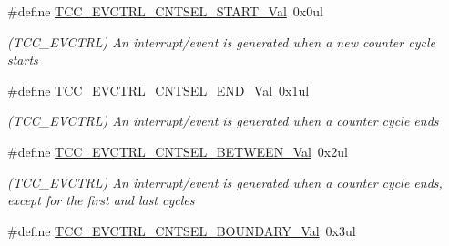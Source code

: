 \begin{DoxyCompactItemize}
\item 
\hypertarget{group___s_a_m_l21___t_c_c_ga6b0dbea0f015556a2f82dd810498d8b9}{}\#define \hyperlink{group___s_a_m_l21___t_c_c_ga6b0dbea0f015556a2f82dd810498d8b9}{T\+C\+C\+\_\+\+E\+V\+C\+T\+R\+L\+\_\+\+C\+N\+T\+S\+E\+L\+\_\+\+S\+T\+A\+R\+T\+\_\+\+Val}~0x0ul\label{group___s_a_m_l21___t_c_c_ga6b0dbea0f015556a2f82dd810498d8b9}

\begin{DoxyCompactList}\small\item\em (T\+C\+C\+\_\+\+E\+V\+C\+T\+R\+L) An interrupt/event is generated when a new counter cycle starts \end{DoxyCompactList}\item 
\hypertarget{group___s_a_m_l21___t_c_c_ga7b614ceff03c6718b96e7e09fbcd6308}{}\#define \hyperlink{group___s_a_m_l21___t_c_c_ga7b614ceff03c6718b96e7e09fbcd6308}{T\+C\+C\+\_\+\+E\+V\+C\+T\+R\+L\+\_\+\+C\+N\+T\+S\+E\+L\+\_\+\+E\+N\+D\+\_\+\+Val}~0x1ul\label{group___s_a_m_l21___t_c_c_ga7b614ceff03c6718b96e7e09fbcd6308}

\begin{DoxyCompactList}\small\item\em (T\+C\+C\+\_\+\+E\+V\+C\+T\+R\+L) An interrupt/event is generated when a counter cycle ends \end{DoxyCompactList}\item 
\hypertarget{group___s_a_m_l21___t_c_c_gacb6b351d27dd1a742733d00d666a5513}{}\#define \hyperlink{group___s_a_m_l21___t_c_c_gacb6b351d27dd1a742733d00d666a5513}{T\+C\+C\+\_\+\+E\+V\+C\+T\+R\+L\+\_\+\+C\+N\+T\+S\+E\+L\+\_\+\+B\+E\+T\+W\+E\+E\+N\+\_\+\+Val}~0x2ul\label{group___s_a_m_l21___t_c_c_gacb6b351d27dd1a742733d00d666a5513}

\begin{DoxyCompactList}\small\item\em (T\+C\+C\+\_\+\+E\+V\+C\+T\+R\+L) An interrupt/event is generated when a counter cycle ends, except for the first and last cycles \end{DoxyCompactList}\item 
\hypertarget{group___s_a_m_l21___t_c_c_ga1f6a4d6c76708fd01738a1ed7af8d3d2}{}\#define \hyperlink{group___s_a_m_l21___t_c_c_ga1f6a4d6c76708fd01738a1ed7af8d3d2}{T\+C\+C\+\_\+\+E\+V\+C\+T\+R\+L\+\_\+\+C\+N\+T\+S\+E\+L\+\_\+\+B\+O\+U\+N\+D\+A\+R\+Y\+\_\+\+Val}~0x3ul\label{group___s_a_m_l21___t_c_c_ga1f6a4d6c76708fd01738a1ed7af8d3d2}


\end{DoxyCompactItemize}
